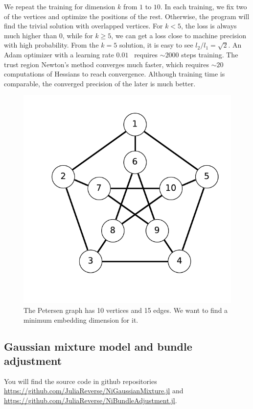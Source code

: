 \documentclass{article}
\newcommand{\<}{\langle}
\renewcommand{\>}{\rangle}
\theoremstyle{definition}\newtheorem{definition}{\textit{Definition}}
\begin{document}
We repeat the training for dimension $k$ from $1$ to $10$.
In each training, we fix two of the vertices and optimize the positions of the rest. Otherwise, the program will find the trivial solution with overlapped vertices. 
For $k < 5$, the loss is always much higher than $0$,
while for $k\geq5$, we can get a loss close to machine precision with high probability.
From the $k=5$ solution, it is easy to see $l_2/l_1 = \sqrt{2}$.
An Adam optimizer with a learning rate $0.01$~\cite{Kingma2014} requires $\sim2000$ steps training.
The trust region Newton's method converges much faster, which requires $\sim 20$ computations of Hessians to reach convergence.
Although training time is comparable, the converged precision of the later is much better.
\begin{figure}
    \centerline{\includegraphics[width=0.4\columnwidth,trim={0 1cm 0 0},clip]{petersen.pdf}}
    \caption{The Petersen graph has 10 vertices and 15 edges. We want to find a minimum embedding dimension for it.}\label{fig:petersen}
\end{figure}


\subsection{Gaussian mixture model and bundle adjustment}
You will find the source code in github repositories \href{https://github.com/JuliaReverse/NiGaussianMixture.jl}{https://github.com/JuliaReverse/NiGaussianMixture.jl} and \href{https://github.com/JuliaReverse/NiBundleAdjustment.jl}{https://github.com/JuliaReverse/NiBundleAdjustment.jl}.
\end{document}

